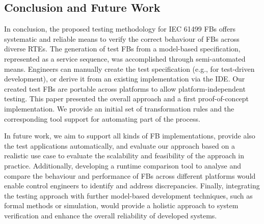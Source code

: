 \begin{bibunit}
\section{Conclusion and Future Work}
In conclusion, the proposed testing methodology for IEC 61499 FBs offers systematic and reliable means to verify the correct behaviour of FBs across diverse RTEs. The generation of test FBs from a model-based specification, represented as a service sequence, was accomplished through semi-automated means. Engineers can manually create the test specification (e.g., for test-driven development), or derive it from an existing implementation via the IDE. Our created test FBs are portable across platforms to allow platform-independent testing. This paper presented the overall approach and a first proof-of-concept implementation. We provide an initial set of transformation rules and the corresponding tool support for automating part of the process.

In future work, we aim to support all kinds of FB implementations, provide also the test applications automatically, and evaluate our approach based on a realistic use case to evaluate the scalability and feasibility of the approach in practice. Additionally, developing a runtime comparison tool to analyse and compare the behaviour and performance of FBs across different platforms would enable control engineers to identify and address discrepancies. Finally, integrating the testing approach with further model-based development techniques, such as formal methods or simulation, would provide a holistic approach to system verification and enhance the overall reliability of developed systems.

\clearpage
\putbib
\end{bibunit} 